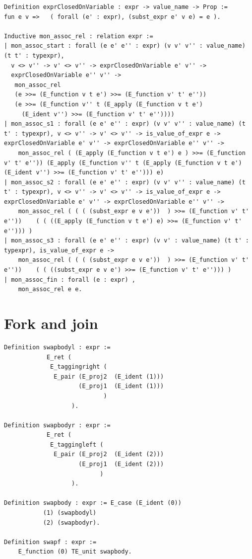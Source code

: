 \documentclass[12pt,twoside,notitlepage]{report}
\theoremstyle{plain}%
\theoremstyle{definition}
\theoremstyle{remark}
\begin{document}
\begin{minipage}{\linewidth}
\begin{lstlisting}[language={Coq}, caption={Monadic associativity}]
Definition exprClosedOnVariable : expr -> value_name -> Prop := 
fun e v =>   ( forall (e' : expr), (subst_expr e' v e) = e ).

Inductive mon_assoc_rel : relation expr :=
| mon_assoc_start : forall (e e' e'' : expr) (v v' v'' : value_name) 
(t t' : typexpr), 
  v <> v'' -> v' <> v'' -> exprClosedOnVariable e' v'' ->
  exprClosedOnVariable e'' v'' ->
   mon_assoc_rel 
   (e >>= (E_function v t e') >>= (E_function v' t' e''))
   (e >>= (E_function v'' t (E_apply (E_function v t e') 
     (E_ident v'') >>= (E_function v' t' e''))))
| mon_assoc_s1 : forall (e e' e'' : expr) (v v' v'' : value_name) (t t' : typexpr), v <> v'' -> v' <> v'' -> is_value_of_expr e ->  exprClosedOnVariable e' v'' -> exprClosedOnVariable e'' v'' ->
    mon_assoc_rel ( (E_apply (E_function v t e') e ) >>= (E_function v' t' e'')) (E_apply (E_function v'' t (E_apply (E_function v t e') (E_ident v'') >>= (E_function v' t' e''))) e)
| mon_assoc_s2 : forall (e e' e'' : expr) (v v' v'' : value_name) (t t' : typexpr), v <> v'' -> v' <> v'' -> is_value_of_expr e -> exprClosedOnVariable e' v'' -> exprClosedOnVariable e'' v'' ->
    mon_assoc_rel ( ( ( (subst_expr e v e'))  ) >>= (E_function v' t' e''))    ( ( ((E_apply (E_function v t e') e) >>= (E_function v' t' e''))) )
| mon_assoc_s3 : forall (e e' e'' : expr) (v v' : value_name) (t t' : typexpr), is_value_of_expr e -> 
    mon_assoc_rel ( ( ( (subst_expr e v e'))  ) >>= (E_function v' t' e''))    ( ( ((subst_expr e v e') >>= (E_function v' t' e''))) )
| mon_assoc_fin : forall (e : expr) , 
    mon_assoc_rel e e.
\end{lstlisting}
\end{minipage}

\section{Fork and join}
\begin{minipage}{\linewidth}
\begin{lstlisting}[language={Coq}, caption={The original Coq $\mathit{swapf}$ function}, label={lst:orig_coq_swapf}]
Definition swapbodyl : expr :=
            E_ret (  
             E_taggingright (
              E_pair (E_proj2  (E_ident (1))) 
                     (E_proj1  (E_ident (1)))
                            )
                   ).

Definition swapbodyr : expr :=
            E_ret (  
             E_taggingleft (
              E_pair (E_proj2  (E_ident (2))) 
                     (E_proj1  (E_ident (2)))
                           )
                   ).

Definition swapbody : expr := E_case (E_ident (0)) 
           (1) (swapbodyl) 
           (2) (swapbodyr).

Definition swapf : expr :=
    E_function (0) TE_unit swapbody.
\end{lstlisting}
\end{minipage}
\end{document}
